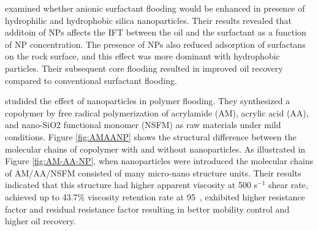 \citet{Zargartalebi2015} examined whether anionic surfactant flooding would be enhanced in presence of hydrophilic and hydrophobic silica nanoparticles. Their results revealed that additoin of NPs affects the IFT between the oil and the surfactant as a function of NP concentration. The presence of NPs also reduced adsorption of surfactans on the rock surface, and this effect was more dominant with hydrophobic particles. Their subsequent core flooding resulted in improved oil recovery compared to conventional surfactant flooding.

\citet{Ye2013} studided the effect of nanoparticles in  polymer flooding. They synthesized a copolymer by free radical polymerization of acrylamide (AM), acrylic acid (AA), and nano-SiO2 functional monomer (NSFM) as raw materials under mild conditions. Figure \ref{fig:AMAANP} shows the structural difference between the molecular chains of copolymer with and without nanoparticles. As illustrated in Figure \ref{fig:AM-AA-NP}, when nanoparticles were introduced the molecular chains of AM/AA/NSFM consisted of many micro-nano structure units. Their results indicated that this structure had higher apparent viscosity at 500 s$^{-1}$ shear rate, achieved up to 43.7\% viscosity retention rate at 95~\celsius, exhibited higher resistance factor and residual resistance factor resulting in better mobility control and higher oil recovery.
